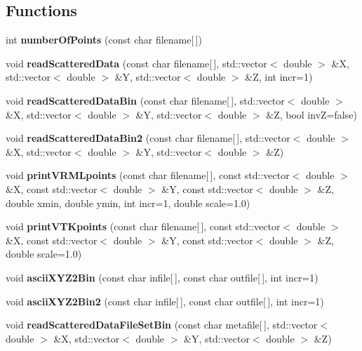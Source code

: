 \subsection*{Functions}
\begin{DoxyCompactItemize}
\item 
int {\bfseries numberOfPoints} (const char filename[$\,$])\label{namespaceUCBspl_a331c5f3a6d8fd57cef76627065c9ec65}

\item 
void {\bfseries readScatteredData} (const char filename[$\,$], std::vector$<$ double $>$ \&X, std::vector$<$ double $>$ \&Y, std::vector$<$ double $>$ \&Z, int incr=1)\label{namespaceUCBspl_a1dec1f79798df13f17b050e5f073c2e0}

\item 
void {\bfseries readScatteredDataBin} (const char filename[$\,$], std::vector$<$ double $>$ \&X, std::vector$<$ double $>$ \&Y, std::vector$<$ double $>$ \&Z, bool invZ=false)\label{namespaceUCBspl_a32ff7fbd8dd750ddb0bca0fc9fced4aa}

\item 
void {\bfseries readScatteredDataBin2} (const char filename[$\,$], std::vector$<$ double $>$ \&X, std::vector$<$ double $>$ \&Y, std::vector$<$ double $>$ \&Z)\label{namespaceUCBspl_a108d73657ee9d10f48bc7f1dd5096b1b}

\item 
void {\bfseries printVRMLpoints} (const char filename[$\,$], const std::vector$<$ double $>$ \&X, const std::vector$<$ double $>$ \&Y, const std::vector$<$ double $>$ \&Z, double xmin, double ymin, int incr=1, double scale=1.0)\label{namespaceUCBspl_ab715a99d4ff9c7843ffed20de987b2b1}

\item 
void {\bfseries printVTKpoints} (const char filename[$\,$], const std::vector$<$ double $>$ \&X, const std::vector$<$ double $>$ \&Y, const std::vector$<$ double $>$ \&Z, double scale=1.0)\label{namespaceUCBspl_a0177f4563ae229dcb5a5bc7e26c839d7}

\item 
void {\bfseries asciiXYZ2Bin} (const char infile[$\,$], const char outfile[$\,$], int incr=1)\label{namespaceUCBspl_a4d4045610694ab0ee26617b8d3110756}

\item 
void {\bfseries asciiXYZ2Bin2} (const char infile[$\,$], const char outfile[$\,$], int incr=1)\label{namespaceUCBspl_ae60e037b6611a75402256ba625a7d0fe}

\item 
void {\bfseries readScatteredDataFileSetBin} (const char metafile[$\,$], std::vector$<$ double $>$ \&X, std::vector$<$ double $>$ \&Y, std::vector$<$ double $>$ \&Z)\label{namespaceUCBspl_a2753ff8fb1f875c09ec0118ce36b1ed8}


\end{DoxyCompactItemize}
